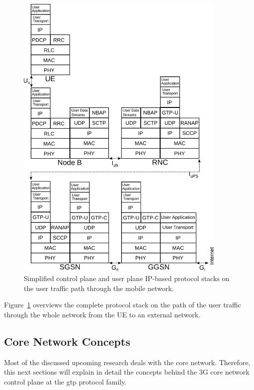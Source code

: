 \begin{figure}[htbp]
	\centering
 	\includegraphics[width=0.9\textwidth]{images/umts-userpath-stack.pdf}
 	\caption{Simplified control plane and user plane \gls{IP}-based protocol stacks on the user traffic path through the mobile network.}
\label{c4:fig:protocolstacks}
\end{figure}

Figure~\ref{c4:fig:protocolstacks} overviews the complete protocol stack on the path of the user traffic through the whole network from the \gls{UE} to an external network.


\subsection{Core Network Concepts}

Most of the discussed upcoming research deals with the core network. Therefore, this next sections will explain in detail the concepts behind the \gls{3G} core network control plane at the \gls{gtp} protocol family.

